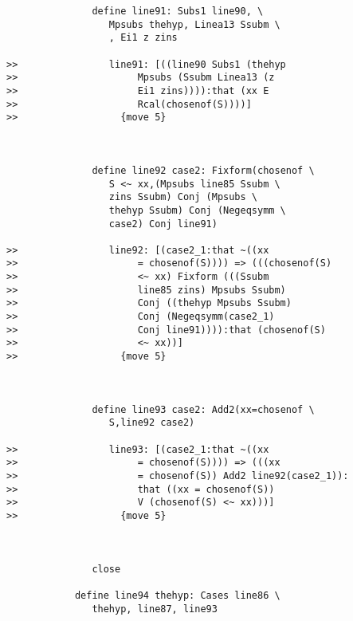 \documentclass[12pt]{article}
\begin{document}
\begin{verbatim}
               define line91: Subs1 line90, \
                  Mpsubs thehyp, Linea13 Ssubm \
                  , Ei1 z zins

>>                line91: [((line90 Subs1 (thehyp
>>                     Mpsubs (Ssubm Linea13 (z
>>                     Ei1 zins)))):that (xx E
>>                     Rcal(chosenof(S))))]
>>                  {move 5}



               define line92 case2: Fixform(chosenof \
                  S <~ xx,(Mpsubs line85 Ssubm \
                  zins Ssubm) Conj (Mpsubs \
                  thehyp Ssubm) Conj (Negeqsymm \
                  case2) Conj line91)

>>                line92: [(case2_1:that ~((xx
>>                     = chosenof(S)))) => (((chosenof(S)
>>                     <~ xx) Fixform (((Ssubm
>>                     line85 zins) Mpsubs Ssubm)
>>                     Conj ((thehyp Mpsubs Ssubm)
>>                     Conj (Negeqsymm(case2_1)
>>                     Conj line91)))):that (chosenof(S)
>>                     <~ xx))]
>>                  {move 5}



               define line93 case2: Add2(xx=chosenof \
                  S,line92 case2)

>>                line93: [(case2_1:that ~((xx
>>                     = chosenof(S)))) => (((xx
>>                     = chosenof(S)) Add2 line92(case2_1)):
>>                     that ((xx = chosenof(S))
>>                     V (chosenof(S) <~ xx)))]
>>                  {move 5}



               close

            define line94 thehyp: Cases line86 \
               thehyp, line87, line93


\end{verbatim}
\end{document}
